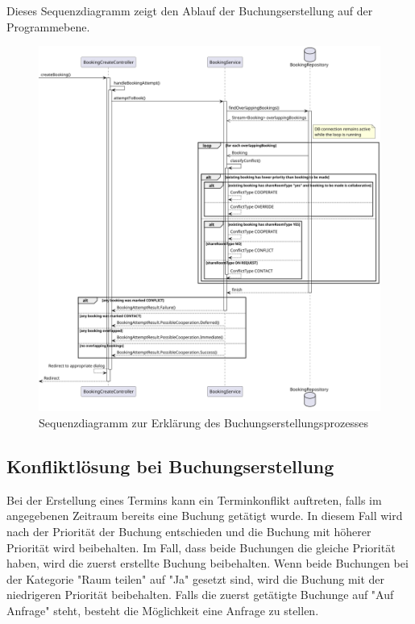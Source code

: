 Dieses Sequenzdiagramm zeigt den Ablauf der Buchungserstellung auf der Programmebene.

\begin{figure}[ht]
    \centering
    \includegraphics[width=\textwidth]{figures/activity/SequenzdiagrammBuchungErstellen}
    \caption{Sequenzdiagramm zur Erklärung des Buchungserstellungsprozesses}
    \label{fig:make-booking-sequence-diagram}
\end{figure}

\subsection{Konfliktlösung bei Buchungserstellung}

Bei der Erstellung eines Termins kann ein Terminkonflikt auftreten, falls im angegebenen Zeitraum bereits eine
Buchung getätigt wurde. In diesem Fall wird nach der Priorität der Buchung entschieden und die Buchung mit
höherer Priorität wird beibehalten. Im Fall, dass beide Buchungen die gleiche Priorität haben, wird die zuerst
erstellte Buchung beibehalten. Wenn beide Buchungen bei der Kategorie "Raum teilen" auf "Ja" gesetzt sind, wird die
Buchung mit der niedrigeren Priorität beibehalten. Falls die zuerst getätigte Buchunge auf "Auf Anfrage" steht,
besteht die Möglichkeit eine Anfrage zu stellen.

